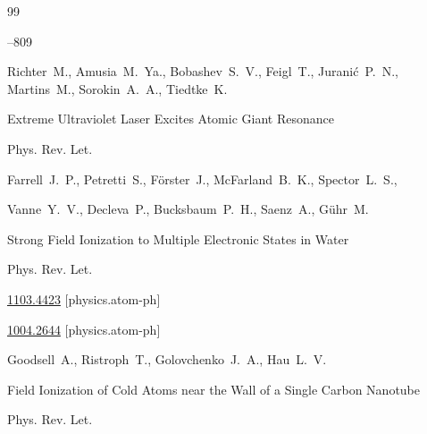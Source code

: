 \begin{thebibliography}{99}


--809






\by Richter~M.,  Amusia~M.~Ya., Bobashev~S.~V.,  Feigl~T., Jurani\'c~P.~N., Martins~M., Sorokin~A.~A.,   Tiedtke~K.

\paper Extreme Ultraviolet Laser Excites Atomic Giant Resonance 

\jour Phys. Rev. Let.  











\by Farrell~J.~P., Petretti~S., F\"orster~J., McFarland~B.~K., Spector~L.~S., 

Vanne~Y.~V., Decleva~P., Bucksbaum~P.~H., Saenz~A., G\"uhr~M.

\paper Strong Field Ionization to Multiple Electronic States in Water 

\jour Phys. Rev. Let. 





\arxiv \href{http://arxiv.org/abs/1103.4423}{1103.4423} [physics.atom-ph]







\arxiv \href{http://arxiv.org/abs/1004.2644}{1004.2644} [physics.atom-ph]

\by Goodsell~A., Ristroph~T., Golovchenko~J.~A., Hau~L.~V.

\paper Field Ionization of Cold Atoms near the Wall of a Single Carbon Nanotube 

\jour Phys. Rev. Let. 





\end{thebibliography}
